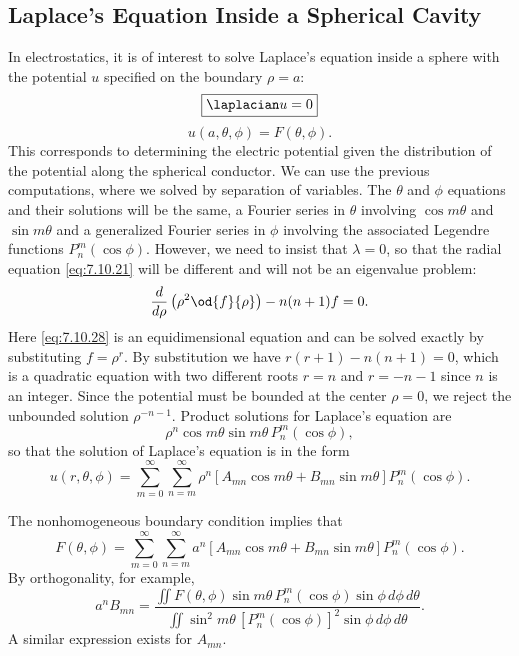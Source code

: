 \subsection{Laplace's Equation Inside a Spherical Cavity}
\label{sec:7.10.6}

In electrostatics, it is of interest to solve Laplace's equation inside a sphere with the potential $u$ specified on the boundary $\rho = a$:
\begin{equation}
\boxed{\laplacian u = 0}
\label{eq:7.10.26}
\end{equation}
\begin{equation}
\boxed{u(a,\theta,\phi) = F(\theta,\phi).}
\label{eq:7.10.27}
\end{equation}
This corresponds to determining the electric potential given the distribution of the potential along the spherical conductor.  We can use the previous computations, where we solved by separation of variables.  The $\theta$ and $\phi$ equations and their solutions will be the same, a Fourier series in $\theta$ involving $\cos m\theta$ and $\sin m\theta$ and a generalized Fourier series in $\phi$ involving the associated Legendre functions $P_n^m(\cos\phi)$.  However, we need to insist that $\lambda = 0$, so that the radial equation \eqref{eq:7.10.21} will be different and will not be an eigenvalue problem:
\begin{equation}
\frac{d}{d \rho}\left(\rho^2\od{f}{\rho}\right) - n(n+1)f = 0.
\label{eq:7.10.28}
\end{equation}
Here \eqref{eq:7.10.28} is an equidimensional equation and can be solved exactly by substituting $f = \rho^r$.  By substitution we have $r(r + 1) - n(n + 1) = 0$, which is a quadratic equation with two different roots $r = n$ and $r = -n - 1$ since $n$ is an integer.  Since the potential must be bounded at the center $\rho = 0$, we reject the unbounded solution $\rho^{-n-1}$.  Product solutions for Laplace's equation are
\begin{equation}
\rho^n\cos m\theta\sin m\theta\,P_n^m(\cos\phi),
\label{eq:7.10.29}
\end{equation}
so that the solution of Laplace's equation is in the form
\begin{equation}
\boxed{u(r,\theta,\phi) = \sum_{m=0}^{\infty}\sum_{n=m}^{\infty}\rho^n[A_{mn}\cos m\theta + B_{mn}\sin m\theta]P_n^m(\cos\phi).}
\label{eq:7.10.30}
\end{equation}

The nonhomogeneous boundary condition implies that
\begin{equation}
F(\theta,\phi) = \sum_{m=0}^{\infty}\sum_{n=m}^{\infty} a^n[A_{mn}\cos m\theta + B_{mn}\sin m\theta]P_n^m(\cos\phi).
\label{eq:7.10.31}
\end{equation}
By orthogonality, for example,
\begin{equation}
\boxed{a^n B_{mn} = \frac{\iint F(\theta,\phi)\sin m\theta\,P_n^m(\cos\phi)\sin\phi\,d\phi\,d\theta}{\iint\sin^2 m\theta\,[P_n^m(\cos\phi)]^2\sin\phi\,d\phi\,d\theta}.}
\label{eq:7.10.32}
\end{equation}
A similar expression exists for $A_{mn}$.

